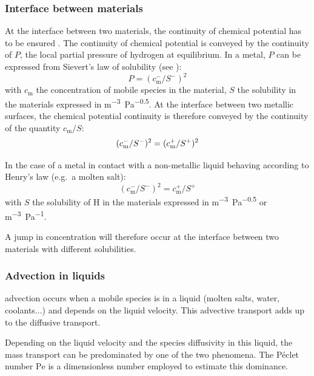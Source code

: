 \subsubsection{Interface between materials}
At the interface between two materials, the continuity of chemical potential has to be ensured .
The continuity of chemical potential is conveyed by the continuity of $P$, the local partial pressure of hydrogen at equilibrium.
In a metal, $P$ can be expressed from Sievert's law of solubility (see ):
\begin{equation}
    P = (c_\mathrm{m}^-/S^-)^2
\end{equation}
with $c_\mathrm{m}$ the concentration of mobile species in the material, $S$ the solubility in the materials expressed in \si{m^{-3}.Pa^{-0.5}}.
At the interface between two metallic surfaces, the chemical potential continuity is therefore conveyed by the continuity of the quantity $c_\mathrm{m}/S$:
\begin{equation}
    (c_\mathrm{m}^-/S^-)^2 = (c_\mathrm{m}^+/S^+)^2
    \labeq{c/s conservation}
\end{equation}

In the case of a metal in contact with a non-metallic liquid behaving according to Henry's law (e.g.\ a molten salt):
\begin{equation}
    (c_\mathrm{m}^-/S^-)^2 = c_\mathrm{m}^+/S^+
\end{equation}
with $S$ the solubility of \gls{H} in the materials expressed in \si{m^{-3}.Pa^{-0.5}} or \si{m^{-3}.Pa^{-1}}.

A jump in concentration will therefore occur at the interface between two materials with different solubilities.

\subsubsection{Advection in liquids}
\Gls{advection} occurs when a mobile species is in a liquid (molten salts, water, coolants...) and depends on the liquid velocity.
This advective transport adds up to the diffusive transport.

Depending on the liquid velocity and the species diffusivity in this liquid, the mass transport can be predominated by one of the two phenomena.
The Péclet number $\mathrm{Pe}$ is a dimensionless number employed to estimate this dominance.

